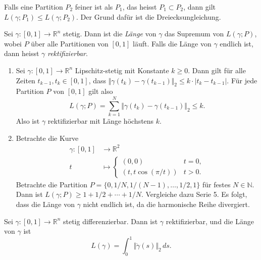 \documentclass[../main.tex]{subfiles}
\begin{document}
\begin{remark}
  Falls eine Partition $P_2$ feiner ist als $P_1$,
  das heisst $P_1 \subset P_2$,
  dann gilt $L(\gamma ; P_1) \leq L(\gamma ; P_2)$.
  Der Grund dafür ist die Dreiecksungleichung.
\end{remark}

\begin{definition}
  Sei $\gamma \colon [0, 1] \to \mathbb{R}^n$ stetig.
  Dann ist die \emph{Länge} von $\gamma$
  das Supremum von $L(\gamma ; P)$, wobei
  $P$ über alle Partitionen von $[0, 1]$ läuft.
  Falls die Länge von $\gamma$ endlich ist,
  dann heisst $\gamma$ \emph{rektifizierbar}.
\end{definition}

\begin{examples}
  \leavevmode
  \begin{enumerate}[(1)]
    \item Sei $\gamma \colon [0, 1] \to \mathbb{R}^n$ 
      Lipschitz-stetig
      mit Konstante $k \geq 0$.
      Dann gilt für alle Zeiten $t_{k-1}, t_k \in [0, 1]$, dass
      \(
        \Vert \gamma(t_k) - \gamma(t_{k-1})\Vert_{2}
        \leq k \cdot | t_k - t_{k-1} |
      \).
      Für jede Partition $P$ von $[0, 1]$ gilt also
      \[
        L(\gamma ; P) = \sum_{k=1}^{N} \Vert \gamma(t_k) - \gamma(t_{k-1})
        \Vert_2 \leq k.
      \]
      Also ist $\gamma$ rektifizierbar mit Länge höchstens $k$.
    \item Betrachte die Kurve
      \begin{align*}
        \gamma \colon [0, 1] & \to \mathbb{R}^2 \\
        t & \mapsto 
        \begin{cases}
          (0, 0) & t = 0, \\
          (t, t \cos(\pi/t)) & t > 0.
        \end{cases}
      \end{align*}
      Betrachte die Partition
      $P = \{0, 1/N, 1/(N-1), \dots, 1/2, 1\}$ für festes
      $N \in \mathbb{N}$.
      Dann ist $L(\gamma ; P) \geq 1 + 1/2 + \cdots + 1/N$.
      Vergleiche dazu Serie 5.
      Es folgt, dass die Länge von $\gamma$ nicht endlich ist,
      da die harmonische Reihe divergiert.
  \end{enumerate}
\end{examples}

\begin{theorem*}
  Sei $\gamma \colon [0, 1] \to \mathbb{R}^n$ stetig differenzierbar.
  Dann ist $\gamma$ rektifizierbar, und die Länge von $\gamma$ ist
  \[
    L(\gamma) = \int_{0}^{1} \Vert \dot \gamma(s) \Vert_2 \, ds.
  \]
\end{theorem*}
\end{document}
